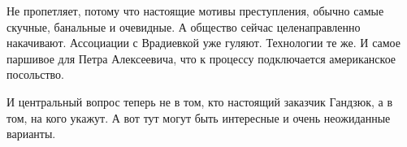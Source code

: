Не пропетляет, потому что настоящие мотивы преступления, обычно самые скучные,
банальные и очевидные. А общество сейчас целенаправленно накачивают. Ассоциации
с Врадиевкой уже гуляют. Технологии те же. И самое паршивое для Петра
Алексеевича, что к процессу подключается американское посольство. 

И центральный вопрос теперь не в том, кто настоящий заказчик Гандзюк, а в том,
на кого укажут. А вот тут могут быть интересные и очень неожиданные варианты.

